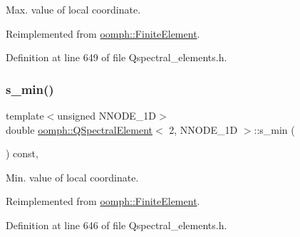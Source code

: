 Max. value of local coordinate. 



Reimplemented from \hyperlink{classoomph_1_1FiniteElement_a64adbe9356927133686ab53f00341ea8}{oomph\+::\+Finite\+Element}.



Definition at line 649 of file Qspectral\+\_\+elements.\+h.

\mbox{\label{classoomph_1_1QSpectralElement_3_012_00_01NNODE__1D_01_4_aea9f9b9a177a883374085238468ae882}} 
\subsubsection{\texorpdfstring{s\+\_\+min()}{s\_min()}}
{\footnotesize\ttfamily template$<$unsigned N\+N\+O\+D\+E\+\_\+1D$>$ \\
double \hyperlink{classoomph_1_1QSpectralElement}{oomph\+::\+Q\+Spectral\+Element}$<$ 2, N\+N\+O\+D\+E\+\_\+1D $>$\+::s\+\_\+min (\begin{DoxyParamCaption}{ }\end{DoxyParamCaption}) const\hspace{0.3cm}{\ttfamily [inline]}, {\ttfamily [virtual]}}



Min. value of local coordinate. 



Reimplemented from \hyperlink{classoomph_1_1FiniteElement_a35f0803115b68bd162c07de04eeb6c5c}{oomph\+::\+Finite\+Element}.



Definition at line 646 of file Qspectral\+\_\+elements.\+h.

\mbox{\label{classoomph_1_1QSpectralElement_3_012_00_01NNODE__1D_01_4_ab9aae4be09977c4e2b457c27eb05e436}} 
